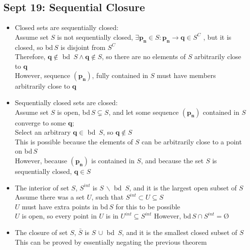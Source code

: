 \documentclass[10pt, oneside]{article}
\let \foo \O
\renewcommand{\O}{\text{\foo}}
\renewcommand{\vec}[1]{\mathbf{#1}}
\begin{document}
\subsection{Sept 19: Sequential Closure}
\begin{itemize}
    \item Closed sets are sequentially closed:\\
    Assume set $S$ is not sequentially closed, $\exists \vec{p_n} \in S : \vec{p_n} \rightarrow \vec{q} \in S^C$ , but it is closed, so bd$\, S$ is disjoint from $S^C$\\
    Therefore, $\vec{q} \notin$ bd $\, S \land \vec{q} \notin S$, so there are no elements of $S$ arbitrarily close to $\vec{q}$\\
    However, sequence $(\vec{p_n})$, fully contained in $S$ must have members arbitrarily close to $\vec{q}$
    \item Sequentially closed sets are closed:\\
    Assume set $S$ is open, bd$\, S \subsetneq S$, and let some sequence $(\vec{p_n})$ contained in $S$ converge to some $\vec{q}$;\\
    Select an arbitrary $\vec{q} \in$ bd $\, S$, so $\vec{q} \notin S$\\
    This is possible because the elements of $S$ can be arbitrarily close to a point on bd$\, S$\\
    However, because $(\vec{p_n})$ is contained in $S$, and because the set $S$ is sequentially closed,  $\vec{q} \in S$
    \item The interior of set $S$, $S^{int}$ is $S \, \backslash$ bd $\, S$, and it is the largest open subset of $S$\\
    Assume there was a set $U$, such that $S^{int} \subset U \subseteq S$\\
    $U$ must have extra points in bd$\, S$ for this to be possible\\
    $U$ is open, so every point in $U$ is in $U^{int} \subseteq S^{int}$
    However, bd$\, S \cap S^{int} = \O$
    \item The closure of set $S$, $\bar{S}$ is $S \, \cup $ bd $\, S$, and it is the smallest closed subset of $S$\\
    This can be proved by essentially negating the previous theorem
\end{itemize}
\end{document}
